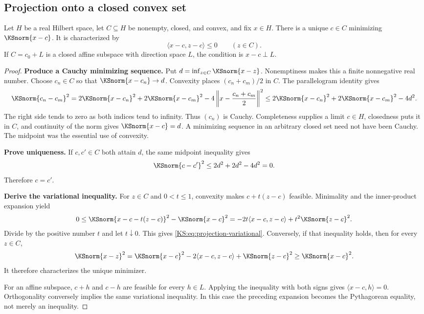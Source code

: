\documentclass[11pt,oneside,openany]{book}
\numberwithin{equation}{section}
\begin{document}
\subsection{Projection onto a closed convex set}
\begin{KSlemma}\label{KS:lem:projection-tool}
Let \(H\) be a real Hilbert space, let \(C\subseteq H\) be nonempty, closed, and convex, and fix \(x\in H\). There is a unique \(c\in C\) minimizing \(\KSnorm{x-c}\). It is characterized by
\begin{equation}\label{KS:eq:projection-variational}
 \langle x-c,z-c\rangle\le0\qquad(z\in C).
\end{equation}
If \(C=c_0+L\) is a closed affine subspace with direction space \(L\), the condition is \(x-c\perp L\).
\end{KSlemma}
\begin{proof}
\textbf{Produce a Cauchy minimizing sequence.} Put \(d=\inf_{z\in C}\KSnorm{x-z}\). Nonemptiness makes this a finite nonnegative real number. Choose \(c_n\in C\) so that \(\KSnorm{x-c_n}\to d\). Convexity places \((c_n+c_m)/2\) in \(C\). The parallelogram identity gives
\[
 \KSnorm{c_n-c_m}^2
 =2\KSnorm{x-c_n}^2+2\KSnorm{x-c_m}^2
   -4\left\|x-\frac{c_n+c_m}{2}\right\|^2
 \le2\KSnorm{x-c_n}^2+2\KSnorm{x-c_m}^2-4d^2.
\]
The right side tends to zero as both indices tend to infinity. Thus \((c_n)\) is Cauchy. Completeness supplies a limit \(c\in H\), closedness puts it in \(C\), and continuity of the norm gives \(\KSnorm{x-c}=d\). A minimizing sequence in an arbitrary closed set need not have been Cauchy. The midpoint was the essential use of convexity.

\textbf{Prove uniqueness.} If \(c,c'\in C\) both attain \(d\), the same midpoint inequality gives
\[
 \KSnorm{c-c'}^2\le2d^2+2d^2-4d^2=0.
\]
Therefore \(c=c'\).

\textbf{Derive the variational inequality.} For \(z\in C\) and \(0<t\le1\), convexity makes \(c+t(z-c)\) feasible. Minimality and the inner-product expansion yield
\[
 0\le\KSnorm{x-c-t(z-c)}^2-\KSnorm{x-c}^2
   =-2t\langle x-c,z-c\rangle+t^2\KSnorm{z-c}^2.
\]
Divide by the positive number \(t\) and let \(t\downarrow0\). This gives \eqref{KS:eq:projection-variational}. Conversely, if that inequality holds, then for every \(z\in C\),
\[
 \KSnorm{x-z}^2
 =\KSnorm{x-c}^2-2\langle x-c,z-c\rangle+\KSnorm{z-c}^2
 \ge\KSnorm{x-c}^2.
\]
It therefore characterizes the unique minimizer.

For an affine subspace, \(c+h\) and \(c-h\) are feasible for every \(h\in L\). Applying the inequality with both signs gives \(\langle x-c,h\rangle=0\). Orthogonality conversely implies the same variational inequality. In this case the preceding expansion becomes the Pythagorean equality, not merely an inequality.
\end{proof}
\end{document}
